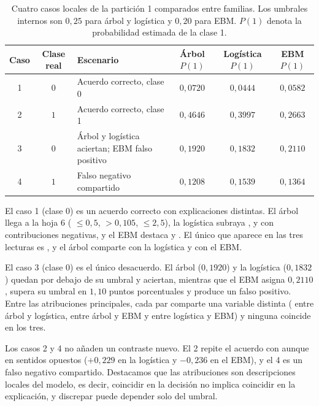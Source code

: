 \begin{table}[H]
	\centering
	\small
	\caption{Cuatro casos locales de la partición 1 comparados entre familias. Los umbrales internos son $0{,}25$ para árbol y logística y $0{,}20$ para EBM. $P(1)$ denota la probabilidad estimada de la clase 1.}
	\label{tab:local-cases}
	\begin{tabularx}{\textwidth}{@{}c c X c c c@{}}
		\toprule
		Caso & Clase real & Escenario & Árbol $P(1)$ & Logística $P(1)$ & EBM $P(1)$ \\
		\midrule
		1 & $0$ & Acuerdo correcto, clase 0 & $0{,}0720$ & $0{,}0444$ & $0{,}0582$ \\
		2 & $1$ & Acuerdo correcto, clase 1 & $0{,}4646$ & $0{,}3997$ & $0{,}2663$ \\
		3 & $0$ & Árbol y logística aciertan; EBM falso positivo & $0{,}1920$ & $0{,}1832$ & $0{,}2110$ \\
		4 & $1$ & Falso negativo compartido & $0{,}1208$ & $0{,}1539$ & $0{,}1364$ \\
		\bottomrule
	\end{tabularx}
\end{table}

El caso 1 (clase 0) es un acuerdo correcto con explicaciones distintas. El árbol llega a la hoja 6 ( $\le 0{,}5$,  $> 0{,}105$,  $\le 2{,}5$), la logística subraya ,  y  con contribuciones negativas, y el EBM destaca  y . El único que aparece en las tres lecturas es , y el árbol comparte  con la logística y  con el EBM.

El caso 3 (clase 0) es el único desacuerdo. El árbol ($0{,}1920$) y la logística ($0{,}1832$) quedan por debajo de su umbral y aciertan, mientras que el EBM asigna $0{,}2110$, supera su umbral en $1{,}10$ puntos porcentuales y produce un falso positivo. Entre las atribuciones principales, cada par comparte una variable distinta ( entre árbol y logística,  entre árbol y EBM y  entre logística y EBM) y ninguna coincide en los tres.

Los casos 2 y 4 no añaden un contraste nuevo. El 2 repite el acuerdo con  aunque en sentidos opuestos ($+0{,}229$ en la logística y $-0{,}236$ en el EBM), y el 4 es un falso negativo compartido. Destacamos que las atribuciones son descripciones locales del modelo, es decir, coincidir en la decisión no implica coincidir en la explicación, y discrepar puede depender solo del umbral.
